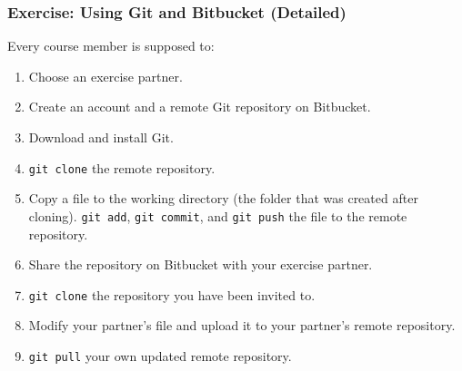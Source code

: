 \documentclass{fenicscourse}
\begin{document}
\begin{frame}
  \frametitle{Exercise: Using Git and Bitbucket (Detailed)}

  Every course member is supposed to:
  \begin{enumerate}
    \item Choose an exercise partner.
    \item Create an account and a remote Git repository on Bitbucket.
    \item Download and install Git.
    \item \texttt{git clone} the remote repository.
    \item Copy a file to the working directory (the folder that was
      created after cloning). \texttt{git add}, \texttt{git commit},
      and \texttt{git push} the file to the remote repository.
    \item Share the repository on Bitbucket with your exercise partner.
    \item \texttt{git clone} the repository you have been invited to.
    \item Modify your partner's file and upload it to your partner's remote repository.
    \item \texttt{git pull} your own updated remote repository.
  \end{enumerate}
\end{frame}
\end{document}

